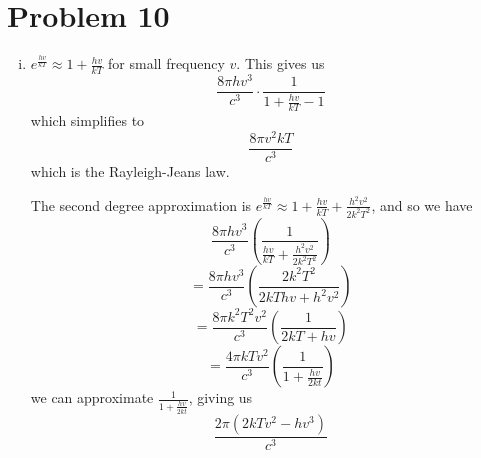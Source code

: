 \documentclass[11pt]{article} %
\begin{document}
\section*{Problem 10}
\begin{enumerate}[i.)]
\item $e^{\frac{hv}{kT}} \approx 1+\frac{hv}{kT}$ for small frequency $v$. This gives us 
	$$\frac{8\pi hv^3}{c^3} \cdot \frac{1}{1+\frac{hv}{kT} -1}$$
which simplifies to
	$$\frac{8\pi v^2kT}{c^3}$$
which is the Rayleigh-Jeans law.

\par The second degree approximation is $e^{\frac{hv}{kT}} \approx 1+\frac{hv}{kT}+\frac{h^2v^2}{2k^2T^2}$, and so we have
	$$\frac{8\pi hv^3}{c^3}(\frac{1}{\frac{hv}{kT}+\frac{h^2v^2}{2k^2T^2}})$$
	$$=  \frac{8\pi hv^3}{c^3}(\frac{2k^2T^2}{2kThv + h^2v^2})$$
	$$= \frac{8\pi k^2 T^2v^2}{c^3}(\frac{1}{2kT+hv})$$
	$$= \frac{4\pi k Tv^2}{c^3}(\frac{1}{1+\frac{hv}{2kt}})$$
we can approximate $\frac{1}{1+\frac{hv}{2kt}}$, giving us
	$$\frac{2 \pi(2kTv^2 - hv^3)}{c^3}$$


\end{enumerate}
\end{document}
